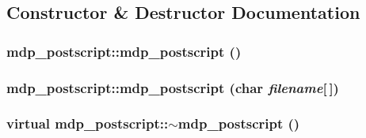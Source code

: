 \subsection{Constructor \& Destructor Documentation}
\hypertarget{classmdp__postscript_a30a69ecea648f202d533b02c8f21f119}{
\subsubsection[{mdp\_\-postscript}]{\setlength{\rightskip}{0pt plus 5cm}mdp\_\-postscript::mdp\_\-postscript ()}}
\label{classmdp__postscript_a30a69ecea648f202d533b02c8f21f119}
\hypertarget{classmdp__postscript_a94b381b18ec3bce5ab2ac9f0f33dcb53}{
\subsubsection[{mdp\_\-postscript}]{\setlength{\rightskip}{0pt plus 5cm}mdp\_\-postscript::mdp\_\-postscript (char {\em filename}\mbox{[}$\,$\mbox{]})}}
\label{classmdp__postscript_a94b381b18ec3bce5ab2ac9f0f33dcb53}
\hypertarget{classmdp__postscript_a3a46d2757dc2954f970987cb3bea2784}{
\subsubsection[{$\sim$mdp\_\-postscript}]{\setlength{\rightskip}{0pt plus 5cm}virtual mdp\_\-postscript::$\sim$mdp\_\-postscript ()}}
\label{classmdp__postscript_a3a46d2757dc2954f970987cb3bea2784}


